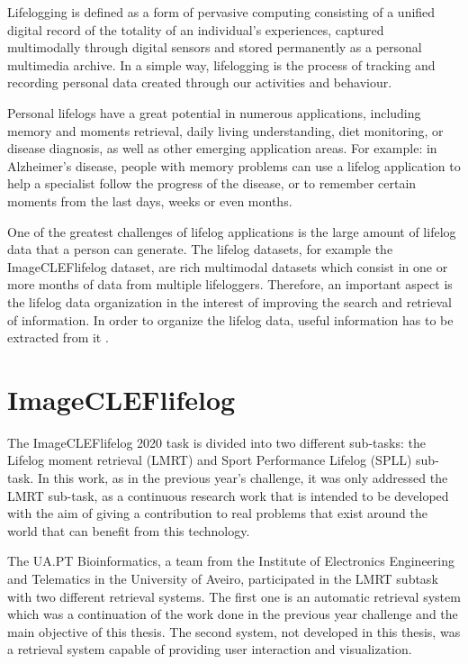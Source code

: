 Lifelogging is defined as a form of pervasive computing consisting of a unified digital record of the totality of an individual’s experiences, captured multimodally through digital sensors and stored permanently as a personal multimedia archive. In a simple way, lifelogging is the process of tracking and recording personal data created through our activities and behaviour.

Personal lifelogs have a great potential in numerous applications, including memory and moments retrieval, daily living understanding, diet monitoring, or disease diagnosis, as well as other emerging application areas. For example: in Alzheimer’s disease, people with memory problems can use a lifelog application to help a specialist follow the progress of the disease, or to remember certain moments from the last days, weeks or even months.

One of the greatest challenges of lifelog applications is the large amount of lifelog data that a person can generate. The lifelog datasets, for example the ImageCLEFlifelog dataset, are rich multimodal datasets which consist in one or more months of data from multiple lifeloggers. Therefore, an important aspect is the lifelog data organization in the interest of improving the search and retrieval of information. In order to organize the lifelog data, useful information has to be extracted from it \cite{Ribeiro2019} \cite{Ribeiro2020}.

\newpage
\section{ImageCLEFlifelog}

\label{sec:imagecleflifelog}


The ImageCLEFlifelog 2020 task is divided into two different sub-tasks: the Lifelog moment retrieval (LMRT) and Sport Performance Lifelog (SPLL) sub-task. In this work, as in the previous year’s challenge, it was only addressed the LMRT sub-task, as a continuous research work that is intended to be developed with the aim of giving a contribution to real problems that exist around the world that can benefit from this technology.
    
The UA.PT Bioinformatics, a team from the Institute of Electronics Engineering and Telematics in the University of Aveiro, participated in the LMRT subtask with two different retrieval systems. The first one is an automatic retrieval system which was a continuation of the work done in the previous year challenge \cite{Ribeiro2019} and the main objective of this thesis. The second system, not developed in this thesis, was a retrieval system capable of providing user interaction and visualization. 

